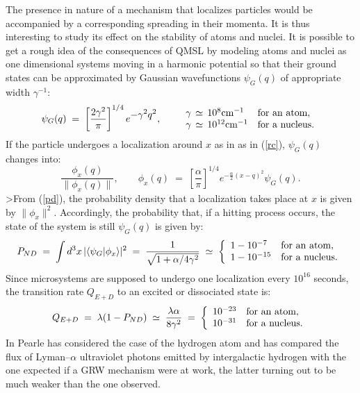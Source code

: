 \documentclass[12pt]{article}
\begin{document}
The presence in nature of a mechanism that localizes particles
would be accompanied by a corresponding spreading in their
momenta. It is thus interesting to study its effect on the
stability of atoms and nuclei. It is possible to get a rough idea
of the consequences of QMSL by modeling atoms and nuclei as one
dimensional systems moving in a harmonic potential so that their
ground states can be approximated by Gaussian wavefunctions
$\psi_{G}(q)$ of appropriate width $\gamma^{-1}$:
\begin{equation}
\psi_{G}(q) \; = \; \left[\frac{2\gamma^{2}}{\pi}\right]^{1/4}
e^{\displaystyle -\gamma^{2}q^{2}}, \qquad
\begin{array}{ll}
\gamma \, \simeq \, 10^{8} \makebox{cm}^{-1} & \makebox{for an
atom}, \\
\gamma \, \simeq \, 10^{12} \makebox{cm}^{-1} & \makebox{for a
nucleus}.
\end{array}
\end{equation}
If the particle undergoes a localization around $x$ as in as in
(\ref{rc}), $\psi_{G}(q)$ changes into:
\begin{equation}
\frac{\phi_{x}(q)}{\|\phi_{x}(q)\|}, \qquad \phi_{x}(q) \; = \;
\left[\frac{\alpha}{\pi}\right]^{1/4} e^{\displaystyle
-\frac{\alpha}{2}(x - q)^{2}} \psi_{G}(q).
\end{equation}
>From (\ref{pd}), the probability density that a localization takes
place at $x$ is given by $\|\phi_{x}\|^2$. Accordingly, the
probability that, if a hitting process occurs, the state of the
system is still $\psi_{G}(q)$ is given by:
\begin{equation}
P_{ND} \; = \; \int d^{3}x\, |\langle \psi_{G}|\phi_{x}
\rangle|^{2} \; = \; \frac{1}{\sqrt{1+ \alpha/4\gamma^{2}}} \;
\simeq \; \left\{
\begin{array}{ll}
1 - 10^{-7} & \makebox{for an atom}, \\
1 - 10^{-15} & \makebox{for a nucleus}.
\end{array} \right.
\end{equation}
Since microsystems are supposed to undergo one localization every
$10^{16}$ seconds, the transition rate $Q_{E+D}$ to an excited or
dissociated state is:
\begin{equation} \label{pdkt}
Q_{E+D} \; = \; \lambda (1 - P_{ND}) \; \simeq \; \frac{\lambda
\alpha}{8\gamma^{2}} \; = \; \left\{
\begin{array}{ll}
10^{-23} & \makebox{for an atom}, \\
10^{-31} & \makebox{for a nucleus}.
\end{array} \right.
\end{equation}
In \cite{prc} Pearle has considered the case of the hydrogen atom and
has compared the flux of Lyman--$\alpha$ ultraviolet photons emitted
by intergalactic hydrogen with the one expected if a GRW mechanism
were at work, the latter turning out to be much weaker than the
one observed.
\end{document}

